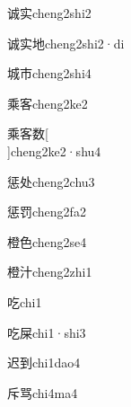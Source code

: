\begin{verbete}[8;8]{诚实}{cheng2shi2}
\end{verbete}

\begin{verbete}[8;8;6]{诚实地}{cheng2shi2·di}
\end{verbete}

\begin{verbete}[9;5]{城市}{cheng2shi4}
\end{verbete}

\begin{verbete}[10;9]{乘客}{cheng2ke2}
\end{verbete}

\begin{verbete}[10;9;13]{乘客数}[\\]{cheng2ke2·shu4}
\end{verbete}

\begin{verbete}[12;5]{惩处}{cheng2chu3}
\end{verbete}

\begin{verbete}[12;9]{惩罚}{cheng2fa2}
\end{verbete}

\begin{verbete}[16;6]{橙色}{cheng2se4}
\end{verbete}

\begin{verbete}[16;5]{橙汁}{cheng2zhi1}
\end{verbete}

\begin{verbete}[6]{吃}{chi1}
\end{verbete}

\begin{verbete}[6;9]{吃屎}{chi1·shi3}
\end{verbete}

\begin{verbete}[7;8]{迟到}{chi1dao4}
\end{verbete}

\begin{verbete}[5;9]{斥骂}{chi4ma4}
\end{verbete}

